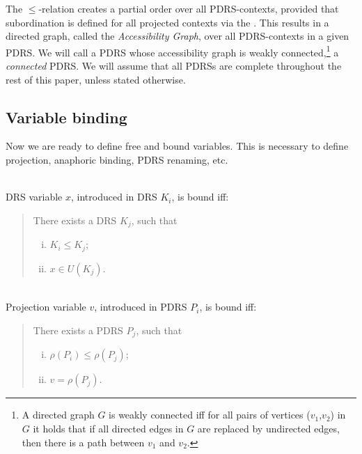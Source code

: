 The $\leq$-relation creates a partial order over all PDRS-contexts, provided
that subordination is defined for all projected contexts via the \MAPs. This
results in a directed graph, called the \textit{Accessibility Graph}, over
all PDRS-contexts in a given PDRS. We will call a PDRS whose accessibility
graph is weakly connected,\footnote{A directed graph $G$ is weakly connected
  iff for all pairs of vertices ($v_1$,$v_2$) in $G$ it holds that if all
  directed edges in $G$ are replaced by undirected edges, then there is
a path between $v_1$ and $v_2$.} a \emph{connected} PDRS. We will assume
that all PDRSs are complete throughout the rest of this paper, unless stated
otherwise.



\subsection{Variable binding}

Now we are ready to define free and bound variables.  This is necessary to
define projection, anaphoric binding, PDRS renaming, etc.

\begin{definition}~\\
DRS variable $x$, introduced in DRS $K_i$, is bound iff:
\begin{quote}
There exists a DRS $K_j$, such that
\begin{enumerate}[i.]
  \item $K_i \leq K_j$;
  \item $x\in U(K_j)$. %
\end{enumerate}
\end{quote}
\end{definition}

\begin{definition}~\\
Projection variable $v$, introduced in PDRS $P_i$, is bound iff:
\begin{quote}
There exists a PDRS $P_j$, such that
\begin{enumerate}[i.]
  \item $\rho(P_i) \leq \rho(P_j)$; %
  \item $v = \rho(P_j)$.
\end{enumerate}
\end{quote}
\end{definition}

